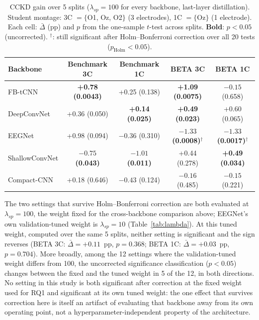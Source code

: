 \documentclass[11pt,a4paper,twoside,asymmetric]{article}
\begin{document}
\begin{table}[htbp]
\caption{CCKD gain over 5 splits ($\lambda_{sp}=100$ for every backbone, last-layer distillation). Student montage: 3C $=\{$O1, Oz, O2$\}$ (3 electrodes), 1C $=\{$Oz$\}$ (1 electrode). Each cell: $\bar\Delta$ (pp) and $p$ from the one-sample $t$-test across splits. \textbf{Bold}: $p<0.05$ (uncorrected). $^\dagger$: still significant after Holm--Bonferroni correction over all 20 tests ($p_{\text{Holm}}<0.05$).}
\label{tab:rq1}
\begin{center}
\footnotesize
\begin{tabular}{lcccc}
\toprule
Backbone & Benchmark 3C & Benchmark 1C & BETA 3C & BETA 1C \\
\midrule
FB-tCNN & \textbf{+0.78 (0.0043)} & +0.25 (0.138) & \textbf{+1.09 (0.0075)} & $-0.15$ (0.658) \\
DeepConvNet & +0.36 (0.050) & \textbf{+0.14 (0.025)} & \textbf{+0.49 (0.023)} & +0.60 (0.065) \\
EEGNet & +0.98 (0.094) & $-0.36$ (0.310) & \textbf{$-1.33$ (0.0008)}$^\dagger$ & \textbf{$-1.33$ (0.0017)}$^\dagger$ \\
ShallowConvNet & \textbf{$-0.75$ (0.043)} & \textbf{$-1.01$ (0.011)} & +0.44 (0.278) & \textbf{+0.49 (0.034)} \\
Compact-CNN & +0.18 (0.646) & $-0.43$ (0.124) & $-0.16$ (0.485) & $-0.15$ (0.221) \\
\bottomrule
\end{tabular}
\end{center}
\end{table}

The two settings that survive Holm--Bonferroni correction are both evaluated at $\lambda_{sp}=100$, the weight fixed for the cross-backbone comparison above; EEGNet's own validation-tuned weight is $\lambda_{sp}=10$ (Table~\ref{tab:lambda}). At this tuned weight, computed over the same 5 splits, neither setting is significant and the sign reverses (BETA 3C: $\bar\Delta=+0.11$~pp, $p=0.368$; BETA 1C: $\bar\Delta=+0.03$~pp, $p=0.704$). More broadly, among the 12 settings where the validation-tuned weight differs from 100, the uncorrected significance classification ($p<0.05$) changes between the fixed and the tuned weight in 5 of the 12, in both directions. No setting in this study is both significant after correction at the fixed weight used for RQ1 and significant at its own tuned weight: the one effect that survives correction here is itself an artifact of evaluating that backbone away from its own operating point, not a hyperparameter-independent property of the architecture.
\end{document}
